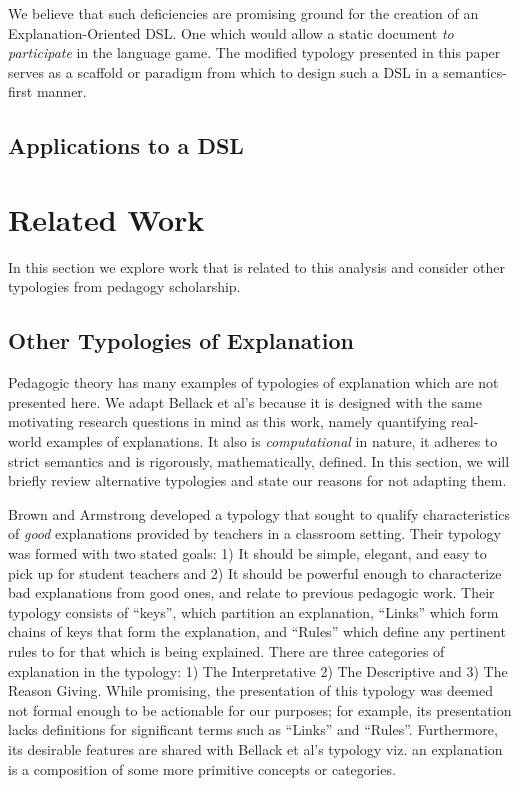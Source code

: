 \documentclass[conference]{IEEEtran}
\begin{document}
We believe that such deficiencies are promising ground for the creation of an
Explanation-Oriented DSL. One which would allow a static document \emph{to
  participate} in the language game. The modified typology presented in this
paper serves as a scaffold or paradigm from which to design such a DSL in a
semantics-first \cite{erwig2011semantics} manner.

\subsection{Applications to a DSL}


\section{Related Work} \label{rw}
In this section we explore work that is related to this analysis and consider other
typologies from pedagogy scholarship.

\subsection{Other Typologies of Explanation}
Pedagogic theory has many examples of typologies of explanation which are not
presented here. We adapt Bellack et al's because it is designed with the same
motivating research questions in mind as this work, namely quantifying
real-world examples of explanations. It also is \emph{computational} in nature,
it adheres to strict semantics and is rigorously, mathematically, defined.
In this section, we will briefly review alternative typologies and state our
reasons for not adapting them.

Brown and Armstrong\cite{brown1984explaining} developed a typology that sought
to qualify characteristics of \emph{good} explanations provided by teachers in a
classroom setting. Their typology was formed with two stated goals: 1) It should
be simple, elegant, and easy to pick up for student teachers and 2) It should be
powerful enough to characterize bad explanations from good ones, and relate to
previous pedagogic work. Their typology consists of ``keys'', which partition an
explanation, ``Links'' which form chains of keys that form the
explanation, and ``Rules'' which define any pertinent rules to for that which is
being explained. There are three categories of explanation in the typology: 1) The
Interpretative 2) The Descriptive and 3) The Reason Giving. While promising,
the presentation of this typology was deemed not formal enough to be actionable
for our purposes; for example, its presentation lacks definitions for significant terms
such as ``Links'' and ``Rules''. Furthermore, its desirable features are shared
with Bellack et al's typology viz. an explanation is a composition of some more
primitive concepts or categories.
\end{document}

